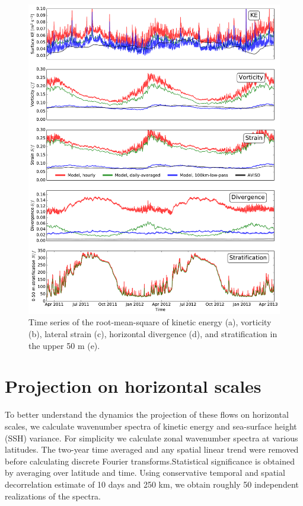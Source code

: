 \documentclass[grl]{agutex2015}
\begin{document}
\begin{article}
 \begin{figure}[ht]
   \begin{center}
     \includegraphics[width=.9\textwidth]{figs/fig2.pdf}
  \caption{Time series of the root-mean-square of kinetic energy (a), vorticity
  (b), lateral strain (c), horizontal divergence (d), and stratification in the upper 50 m (e).}
  \label{fig2}
  \end{center}
\end{figure}

\section{Projection on horizontal scales}

To better understand the dynamics the projection of these flows on horizontal
scales, we calculate wavenumber spectra of kinetic energy and sea-surface height
(SSH) variance. For simplicity we calculate zonal wavenumber spectra at various
latitudes. The two-year time averaged and any spatial linear trend were
removed before calculating discrete Fourier transforms.Statistical significance
is obtained by averaging over latitude and time. Using conservative temporal and
spatial decorrelation estimate of 10 days and 250 km, we obtain roughly 50
independent realizations of the spectra.


\end{article}
\end{document}
